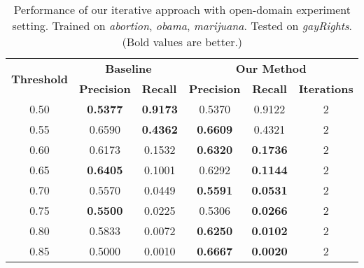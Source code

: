 \documentclass[11pt,a4paper]{article}
\begin{document}
\begin{table*}[h]
\begin{center}
\begin{tabular}{|c||c|c|c|c|c|}
\hline
\multicolumn{1}{|c|}{\multirow{2}{*}{\bf Threshold}} & \multicolumn{2}{c|}{\bf Baseline}  & \multicolumn{3}{c|}{\bf Our Method}    \\ \cline{2-6} 
\multicolumn{1}{|c|}{}   & \multicolumn{1}{l|}{\bf Precision} & \multicolumn{1}{l|}{\bf Recall} & \multicolumn{1}{l|}{\bf Precision} & \multicolumn{1}{c|}{\bf Recall} & \multicolumn{1}{l|}{\bf Iterations} \\ \hline
 \hline
0.50     & \bf 0.5377& \bf0.9173   & 0.5370 & 0.9122    & 2 \\
0.55     & 0.6590& \bf0.4362   &\bf 0.6609 & 0.4321    & 2 \\
0.60     & 0.6173& 0.1532   &\bf 0.6320 &\bf 0.1736    & 2 \\
0.65     &\bf 0.6405& 0.1001   & 0.6292 & \bf0.1144    & 2 \\
0.70     & 0.5570& 0.0449   &\bf 0.5591 &\bf 0.0531    & 2 \\
0.75     &\bf 0.5500& 0.0225   & 0.5306 &\bf 0.0266    & 2 \\
0.80     & 0.5833& 0.0072   &\bf 0.6250 &\bf 0.0102    & 2 \\
0.85     & 0.5000& 0.0010   &\bf 0.6667 &\bf 0.0020    & 2
\\\hline
\end{tabular}
\end{center}
\caption{\label{tab:cross-gay} Performance of our iterative approach with open-domain experiment setting. Trained on {\it abortion}, {\it obama}, {\it marijuana}. Tested on {\it gayRights}. (Bold values are better.)}
\end{table*}
\end{document}

